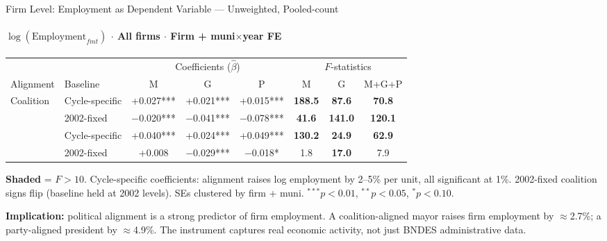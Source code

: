 \documentclass[aspectratio=169,10pt]{beamer}
\newcommand{\fpass}[1]{\cellcolor{pass}\textbf{#1}}
\begin{document}

\begin{frame}[t]{Firm Level: Employment as Dependent Variable --- Unweighted, Pooled-count}
\framesubtitle{$\log(\text{Employment}_{fmt})$ $\cdot$ All firms $\cdot$ Firm + muni$\times$year FE}
\begin{center}
\footnotesize
\setlength{\tabcolsep}{3.5pt}
\renewcommand{\arraystretch}{1.05}
\begin{tabular}{@{}llcccccc@{}}
\toprule
 & & \multicolumn{3}{c}{Coefficients ($\hat\beta$)} & \multicolumn{3}{c}{$F$-statistics} \\
\cmidrule(l{2pt}r{2pt}){3-5} \cmidrule(l{2pt}r{2pt}){6-8}
Alignment & Baseline & M & G & P & M & G & M+G+P \\
\midrule
\multirow{2}{*}{Coalition}
  & Cycle-specific & +0.027*** & +0.021*** & +0.015*** & \fpass{188.5} & \fpass{87.6}  & \fpass{70.8}  \\
  & 2002-fixed     & $-$0.020*** & $-$0.041*** & $-$0.078*** & \fpass{41.6}  & \fpass{141.0} & \fpass{120.1} \\
\addlinespace[4pt]
\multirow{2}{*}{Party}
  & Cycle-specific & +0.040*** & +0.024*** & +0.049*** & \fpass{130.2} & \fpass{24.9}  & \fpass{62.9}  \\
  & 2002-fixed     & +0.008     & $-$0.029*** & $-$0.018*   & 1.8           & \fpass{17.0}  & 7.9           \\
\bottomrule
\end{tabular}
\end{center}
{\scriptsize \colorbox{pass}{\textbf{Shaded}} = $F>10$.
Cycle-specific coefficients: alignment raises log employment by 2--5\% per unit, all
significant at 1\%.
2002-fixed coalition signs flip (baseline held at 2002 levels).
SEs clustered by firm + muni.  $^{***}p<0.01$, $^{**}p<0.05$, $^{*}p<0.10$.}

\vspace{0.4em}
\textcolor{alertred}{\footnotesize\textbf{Implication:} political alignment is a strong predictor of firm employment.  A coalition-aligned mayor raises firm employment by $\approx$2.7\%; a party-aligned president by $\approx$4.9\%.  The instrument captures real economic activity, not just BNDES administrative data.}
\end{frame}

\end{document}
